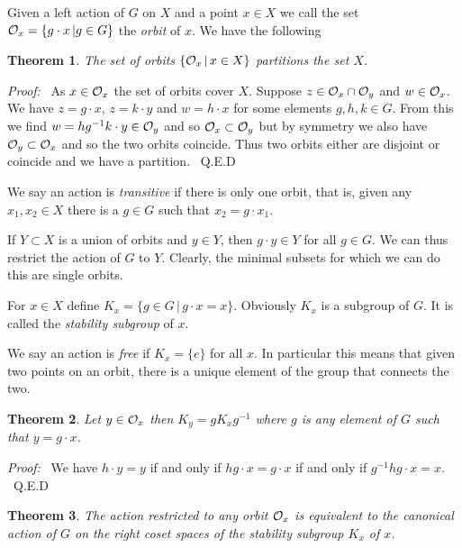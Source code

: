 \documentclass[12pt,titlepage]{article}
\def\cO{{\cal O}}
\newtheorem{theorem}{Theorem}
\newenvironment{proof}{{\em Proof:\/}\ }{\ Q.E.D}
\begin{document}
Given a left action of \(G\) on \(X\) and a point \(x\in X\) we call the
set \(\cO_x=\{g\cdot x\,| g\in G\}\)  the {\em orbit}
%
% 
\index{\(O_x\)@\(\cO_x\)}%
of \(x\). We have
the following
\begin{theorem}
The set of orbits \(\{\cO_x\,|\,x\in X\}\) partitions the set \(X\).
\end{theorem}%
\begin{proof} As \(x\in \cO_x\) the set of orbits cover \(X\). Suppose
\(z\in \cO_x\cap\cO_y\) and \(w \in \cO_x\). We have \(z=g\cdot x\),
\(z = k\cdot y\)   and
\(w = h\cdot x\) for some elements \(g,h,k \in G\).  From this we find
\(w= hg^{-1}k\cdot y\in\cO_y\) and so \(\cO_x \subset \cO_y\)
but by symmetry we
also have \(\cO_y\subset \cO_x\) and so the two orbits coincide. Thus
two orbits either are disjoint or coincide and we have a partition.
\end{proof}%

We say an action is {\em transitive\/}
%
if there is only one orbit, that
is, given any \(x_1,x_2 \in X\) there is a \(g\in G\) such that \(x_2  =
g\cdot x_1\).

If \(Y\subset X\) is a union of orbits and \(y\in Y\), then \(g\cdot y
\in Y\) for all \(g\in G\).  We can thus restrict the action of \(G\) to
\(Y\).   Clearly, the minimal subsets for which we can do this are 
single orbits.


For \(x\in X\)  define \(K_x=\{g\in G\,|\, g\cdot x = x\}\). Obviously
\(K_x\)
%
is a subgroup of \(G\). It is called the {\em stability
subgroup\/}
%
of \(x\).

We say an action is {\em free\/}
%
if \(K_x = \{e\}\) for all \(x\).  In
particular this means that given two points on an orbit, there is a
unique element of the group that connects the two.

\begin{theorem} Let \(y \in \cO_x\) then \(K_y = gK_xg^{-1}\) where
\(g\) is any element of \(G\) such that \(y=g\cdot x\).
\end{theorem}%
\begin{proof}
We have \(h\cdot y = y\) if and only if \(h g\cdot x = g \cdot x\) if
and only if \(g^{-1}hg \cdot x = x\).
\end{proof}%


\begin{theorem}The action restricted to
any orbit \(\cO_x\) is equivalent
to the canonical action of \(G\) on the right coset spaces of the
stability subgroup \(K_x\) of \(x\).
\end{theorem}%
\end{document}
